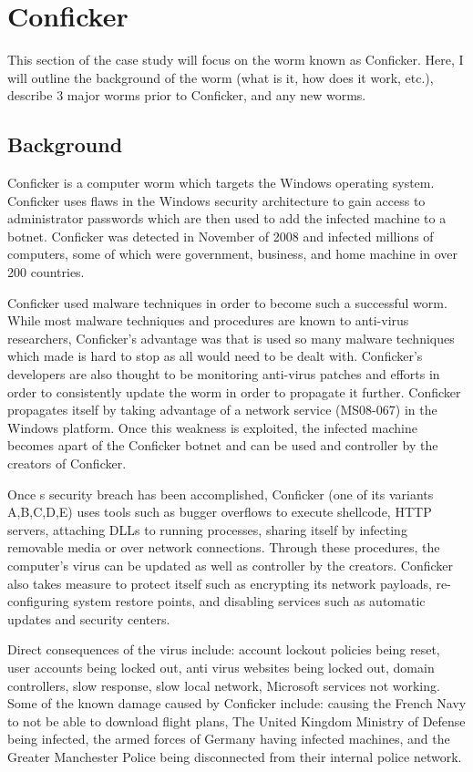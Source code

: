 \documentclass[paper=a4, fontsize=11pt]{scrartcl} %
\numberwithin{equation}{section} %
\numberwithin{figure}{section} %
\numberwithin{table}{section} %
\begin{document}
\section{Conficker}
This section of the case study will focus on the worm known as Conficker. Here, I
will outline the background of the worm (what is it, how does it work, etc.), describe
3 major worms prior to Conficker, and any new worms.



\subsection{Background}
Conficker is a computer worm which targets the Windows operating system. Conficker uses
flaws in the Windows security architecture to gain access to administrator passwords
which are then used to add the infected machine to a botnet. Conficker was detected 
in November of 2008 and infected millions of computers, some of which were government,
business, and home machine in over 200 countries.

Conficker used malware techniques in order to become such a successful worm. While most
malware techniques and procedures are known to anti-virus researchers, Conficker's 
advantage was that is used so many malware techniques which made is hard to stop as
all would need to be dealt with. Conficker's developers are also thought to be monitoring
anti-virus patches and efforts in order to consistently update the worm in order to 
propagate it further. Conficker propagates itself by taking advantage of a network
service (MS08-067) in the Windows platform. Once this weakness is exploited, the infected
machine becomes apart of the Conficker botnet and can be used and controller by the
creators of Conficker.

Once s security breach has been accomplished, Conficker (one of its variants A,B,C,D,E)
uses tools such as bugger overflows to execute shellcode, HTTP servers, attaching DLLs
to running processes, sharing itself by infecting removable media or over network
connections. Through these procedures, the computer's virus can be updated as well as
controller by the creators. Conficker also takes measure to protect itself such as 
encrypting its network payloads, re-configuring system restore points, and disabling
services such as automatic updates and security centers.

Direct consequences of the virus include: account lockout policies being reset, user
accounts being locked out, anti virus websites being locked out, domain controllers,
slow response, slow local network, Microsoft services not working. Some of the known
damage caused by Conficker include: causing the French Navy to not be able
to download flight plans, The United Kingdom Ministry of Defense being infected,
the armed forces of Germany having infected machines, and the Greater Manchester
Police being disconnected from their internal police network.
\end{document}
